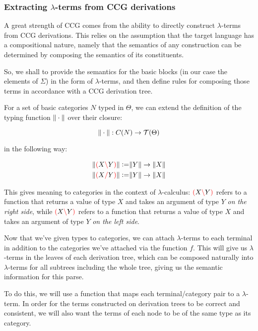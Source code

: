 \documentclass[main.tex]{subfiles}
\begin{document}
\subsubsection{Extracting $\lambda$-terms from CCG derivations}

A great strength of CCG comes from the ability to directly construct $\lambda$-terms
from CCG derivations. This relies on the assumption that the target
language has a compositional nature, namely that the semantics of any construction
can be determined by composing the semantics of its constituents.

So, we shall to provide the semantics for the basic blocks (in our case
the elements of $\Sigma$) in the form of $\lambda$-terms, and then define rules
for composing those terms in accordance with a CCG derivation tree.

\begin{defn}
    For a set of basic categories $N$ typed in $\Theta$, we can extend the
    definition of the typing function $\|\cdot\|$ over their closure:

    \[ \|\cdot\| : C(N) \rightarrow \mathcal{T}( \Theta ) \]

    in the following way:

    \begin{align*}
        \|\textcolor{red}{(} X \textcolor{red}{\backslash} Y \textcolor{red}{)}\| \vcentcolon= & \|Y\| \rightarrow \|X\| \\
        \|\textcolor{red}{(} X \textcolor{red}{/} Y \textcolor{red}{)}\| \vcentcolon= & \|Y\| \rightarrow \|X\| \\
    \end{align*}

    This gives meaning to categories in the context of $\lambda$-calculus:
    $\textcolor{red}{(} X \textcolor{red}{\backslash} Y \textcolor{red}{)}$ refers to a function that returns a value of type
    $X$ and takes an argument of type $Y$ \emph{on the right side}, while
    $\textcolor{red}{(} X \textcolor{red}{\backslash} Y \textcolor{red}{)}$ refers to a function that returns a value of type
    $X$ and takes an argument of type $Y$ \emph{on the left side}.
\end{defn}

Now that we've given types to categories, we can attach $\lambda$-terms
to each terminal in addition to the categories we've attached via the function
$f$. This will give us $\lambda$-terms in the leaves of each derivation tree,
which can be composed naturally into $\lambda$-terms for all subtrees including
the whole tree, giving us the semantic information for this parse.

To do this, we will use a function that maps each terminal/category pair
to a $\lambda$-term. In order for the terms constructed on derivation trees
to be correct and consistent, we will also want the terms of each node to be
of the same type as its category.
\end{document}
